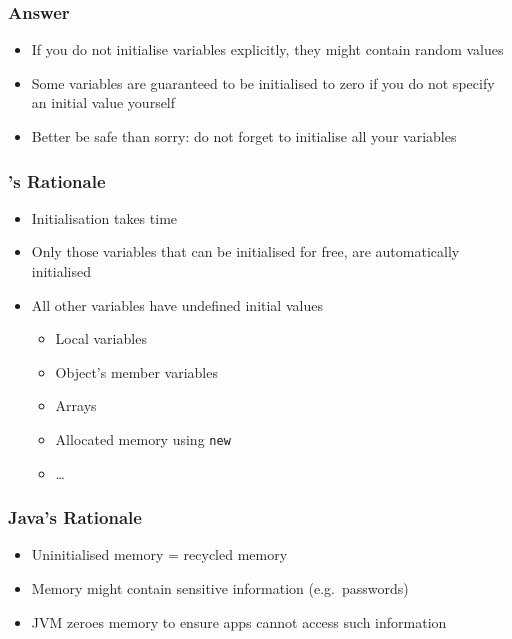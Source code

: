 \documentclass{../ucll-slides}
\begin{document}
\begin{frame}
  \frametitle{Answer}
  \begin{itemize}
    \item If you do not initialise variables explicitly, they might contain random values
    \item Some variables are guaranteed to be initialised to zero if you do not specify an initial value yourself
    \item Better be safe than sorry: do not forget to initialise all your variables
  \end{itemize}
\end{frame}

\begin{frame}
  \frametitle{\cpp's Rationale}
  \begin{itemize}
    \item Initialisation takes time
    \item Only those variables that can be initialised for free, are automatically initialised
    \item All other variables have undefined initial values
          \begin{itemize}
            \item Local variables
            \item Object's member variables
            \item Arrays
            \item Allocated memory using {\tt new}
            \item \dots
          \end{itemize}
  \end{itemize}
\end{frame}

\begin{frame}
  \frametitle{Java's Rationale}
  \begin{itemize}
    \item Uninitialised memory = recycled memory
    \item Memory might contain sensitive information (e.g.\ passwords)
    \item JVM zeroes memory to ensure apps cannot access such information
  \end{itemize}
\end{frame}
\end{document}
